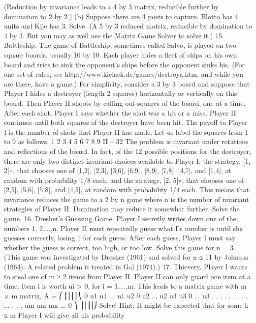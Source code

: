 (Reduction by invariance leads to a 4 by 3 matrix, reducible further by domination to 2
by 2.)
(b) Suppose there are 4 posts to capture. Blotto has 4 units and Kije has 3. Solve.
(A 5 by 3 reduced matrix, reducible by domination to 4 by 3. But you may as well use
the Matrix Game Solver to solve it.)
15. Battleship. The game of Battleship, sometimes called Salvo, is played on two
square boards, usually 10 by 10. Each player hides a fleet of ships on his own board and
tries to sink the opponent’s ships before the opponent sinks his. (For one set of rules, see
http://www.kielack.de/games/destroya.htm, and while you are there, have a game.)
For simplicity, consider a 3 by 3 board and suppose that Player I hides a destroyer
(length 2 squares) horizontally or vertically on this board. Then Player II shoots by calling
out squares of the board, one at a time. After each shot, Player I says whether the shot
was a hit or a miss. Player II continues until both squares of the destroyer have been hit.
The payoff to Player I is the number of shots that Player II has made. Let us label the
squares from 1 to 9 as follows.
1 2 3
4 5 6
7 8 9
II – 32
The problem is invariant under rotations and reflections of the board. In fact, of
the 12 possible positions for the destroyer, there are only two distinct invariant choices
available to Player I: the strategy, [1, 2]∗, that chooses one of [1,2], [2,3], [3,6], [6,9], [8,9],
[7,8], [4,7], and [1,4], at random with probability 1/8 each, and the strategy, [2, 5]∗, that
chooses one of [2,5], [5,6], [5,8], and [4,5], at random with probability 1/4 each. This means
that invariance reduces the game to a 2 by n game where n is the number of invariant
strategies of Player II. Domination may reduce it somewhat further. Solve the game.
16. Dresher’s Guessing Game. Player I secretly writes down one of the numbers
1, 2,...,n. Player II must repeatedly guess what I’s number is until she guesses correctly,
losing 1 for each guess. After each guess, Player I must say whether the guess is correct,
too high, or too low. Solve this game for n = 3. (This game was investigated by Dresher
(1961) and solved for n ≤ 11 by Johnson (1964). A related problem is treated in Gal
(1974).)
17. Thievery. Player I wants to steal one of m ≥ 2 items from Player II. Player II
can only guard one item at a time. Item i is worth ui > 0, for i = 1,...,m. This leads to
a matrix game with m × m matrix,
A =
⎛
⎜⎜⎜⎜⎝
0 u1 u1 ... u1
u2 0 u2 ... u2
u3 u3 0 ... u3
.
.
. .
.
. .
.
. ... .
.
.
um um um ... 0
⎞
⎟⎟⎟⎟⎠
Solve!
Hint: It might be expected that for some k ≤ m Player I will give all his probability
